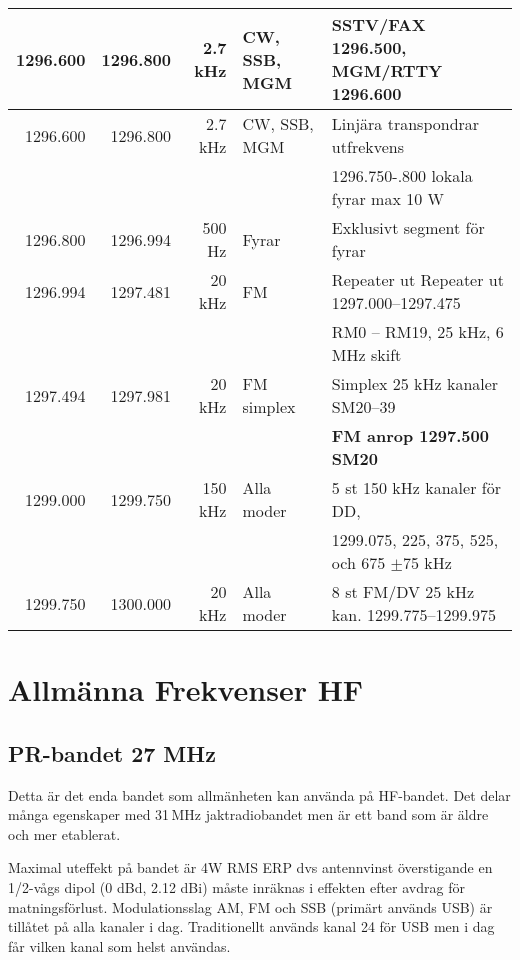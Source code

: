 {{\begin{tabular}{rrrll}
	         1296.600 & 1296.800 &     2.7 kHz & CW, SSB, MGM    & SSTV/FAX 1296.500, MGM/RTTY 1296.600          \\ \hline
	         1296.600 & 1296.800 &     2.7 kHz & CW, SSB, MGM    & Linjära transpondrar utfrekvens               \\
	                  &          &             &                 & 1296.750-.800 lokala fyrar max 10 W           \\ \hline
	         1296.800 & 1296.994 &      500 Hz & Fyrar           & Exklusivt segment för fyrar                   \\ \hline
	         1296.994 & 1297.481 &      20 kHz & FM              & Repeater ut Repeater ut 1297.000--1297.475    \\
	                  &          &             &                 & RM0 – RM19, 25 kHz, 6 MHz skift               \\ \hline
	         1297.494 & 1297.981 &      20 kHz & FM simplex      & Simplex 25 kHz kanaler SM20--39               \\
	                  &          &             &                 & \textbf{FM anrop 1297.500 SM20}               \\ \hline
	         1299.000 & 1299.750 &     150 kHz & Alla moder      & 5 st 150 kHz kanaler för DD,                  \\
	                  &          &             &                 & 1299.075, 225, 375, 525, och 675 $\pm$75 kHz  \\ \hline
	         1299.750 & 1300.000 &      20 kHz & Alla moder      & 8 st FM/DV 25 kHz kan. 1299.775--1299.975
\end{tabular}}

\clearpage

\section{Allmänna Frekvenser HF}

\subsection{PR-bandet 27 MHz}

Detta är det enda bandet som allmänheten kan använda på HF-bandet. Det delar
många egenskaper med 31\,MHz jaktradiobandet men är ett band som är äldre och
mer etablerat.

Maximal uteffekt på bandet är 4W RMS ERP dvs antennvinst överstigande en
1/2-vågs dipol (0 dBd, 2.12 dBi) måste inräknas i effekten efter avdrag för
matningsförlust. Modulationsslag AM, FM och SSB (primärt används USB) är
tillåtet på alla kanaler i dag. Traditionellt används kanal 24 för USB men i
dag får vilken kanal som helst användas.

}
